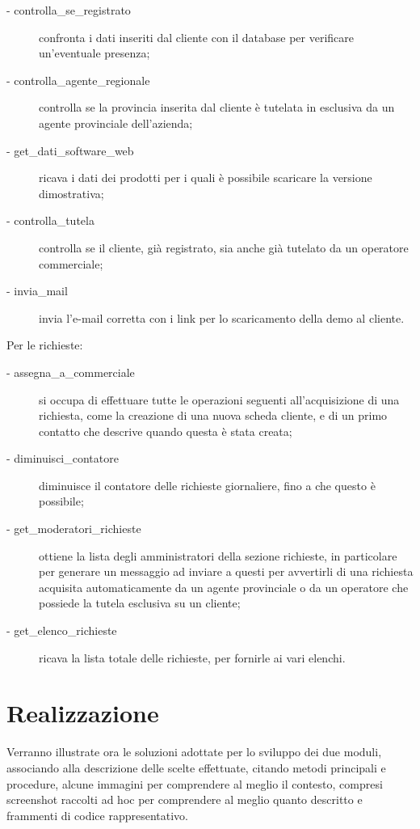 \begin{description}
\item[- controlla\_{}se\_{}registrato] confronta i dati inseriti dal cliente con il database per verificare un'eventuale presenza;
\item[- controlla\_{}agente\_{}regionale] controlla se la provincia inserita dal cliente \`e tutelata in esclusiva da un agente provinciale dell'azienda;
\item[- get\_{}dati\_{}software\_{}web] ricava i dati dei prodotti per i quali \`e possibile scaricare la versione dimostrativa;
\item[- controlla\_{}tutela] controlla se il cliente, gi\`a registrato, sia anche gi\`a tutelato da un operatore commerciale;
\item[- invia\_{}mail] invia l'e-mail corretta con i link per lo scaricamento della demo al cliente.
\end{description}
\noindent
Per le richieste:
\begin{description}
\item[- assegna\_{}a\_{}commerciale] si occupa di effettuare tutte le operazioni seguenti all'acquisizione di una richiesta, come la creazione di una nuova scheda cliente, e di un primo contatto che descrive quando questa \`e stata creata;
\item[- diminuisci\_{}contatore] diminuisce il contatore delle richieste giornaliere, fino a che questo \`e possibile;
\item[- get\_{}moderatori\_{}richieste] ottiene la lista degli amministratori della sezione richieste, in particolare per generare un messaggio ad inviare a questi per avvertirli di una richiesta acquisita automaticamente da un agente provinciale o da un operatore che possiede la tutela esclusiva su un cliente;
\item[- get\_{}elenco\_{}richieste] ricava la lista totale delle richieste, per fornirle ai vari elenchi.
\end{description}



\newpage
\section{Realizzazione}
Verranno illustrate ora le soluzioni adottate per lo sviluppo dei due moduli, associando alla descrizione delle scelte effettuate, citando metodi principali e procedure, alcune immagini per comprendere al meglio il contesto, compresi screenshot raccolti ad hoc per comprendere al meglio quanto descritto e frammenti di codice rappresentativo.
